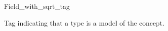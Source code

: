 \begin{ccRefClass}{Field_with_sqrt_tag}
\label{Field_with_sqrt_tag}

\ccDefinition
Tag indicating that a type is a model of the  concept. 


\ccInheritsFrom
{}

\ccIsModel
{}


\ccSeeAlso
{} \\
\\
\end{ccRefClass} 